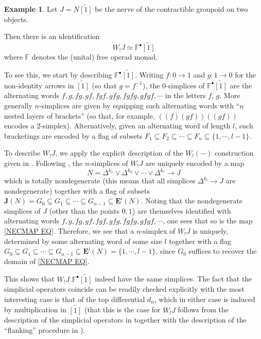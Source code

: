 \documentclass[a4paper,10pt
,draft
]{article}%
\numberwithin{equation}{section}
\numberwithin{figure}{section}
\theoremstyle{definition} %
\newtheorem{example}[equation]{Example}%
\newcommand{\1}{\ensuremath{\mathbbm 1}}%
\begin{document}
\begin{example}\label{WJ EX}
	Let $J = N \widetilde{[1]}$ be the nerve of the contractible groupoid on two objects.
	
	Then there is an identification
\[
	W_{!} J \simeq \mathbb{F}^{\bullet} \widetilde{[1]}
\]
	where $\mathbb{F}$ denotes the (unital) free operad monad.

	To see this, we start by describing
	$\mathbb{F}^{\bullet} \widetilde{[1]}$.
	Writing $f \colon 0 \to 1$ and 
	$g \colon  1\to 0$ for the non-identity arrows in 
	$\widetilde{[1]}$ (so that $g=f^{-1}$), the $0$-simplices of $\mathbb{F}^{\bullet} \widetilde{[1]}$
	are the alternating words
	$f,g,fg,gf,fgf,gfg,fgfg,gfgf,\cdots$
	in the letters $f$, $g$.
	More generally
	$n$-simplices are given by equipping such alternating words with ``$n$ nested layers of brackets''
	(so that, for example, 
	$\left((f)(gf)\right) 
	\left( (gf) \right)$
	encodes a $2$-simplex).
	Alternatively, given an alternating word of length $l$, such bracketings are encoded by a flag of subsets
	$F_1 \subseteq F_2 \subseteq \cdots 
	\subseteq F_n \subseteq \{1,\cdots,l-1\}$.
	
	To describe $W_{!} J$, we apply the explicit description of the $W_{!} (-)$ construction given in 
	\cite{DS11}.
	Following \cite[Cor. 4.8]{DS11}, the $n$-simplices of $W_{!} J$ are uniquely encoded by a map
\begin{equation}\label{NECMAP EQ}
	N = \Delta^{k_1} \vee \Delta^{k_2} 
	\vee \cdots \vee \Delta^{k_r} 
	\to J 
\end{equation}
which is totally nondegenerate (this means that all simplices $\Delta^{k_i} \to J$ are nondegenerate)
together with a flag of subsets
	$\boldsymbol{J}(N) = 
	G_0 \subseteq 
	G_1 \subseteq \cdots \subseteq
	G_{n-1} \subseteq \boldsymbol{E}^{\mathsf{i}}(N)$.
	Noting that the nondegenerate simplices of $J$ (other than the points $0,1$)
	are themselves identified with alternating words
	$f,g,fg,gf,fgf,gfg,fgfg,gfgf,\cdots$,
	one sees that so is the map \eqref{NECMAP EQ}.
	Therefore, we see that a $n$-simplex of 
	$W_{!} J$ is uniquely, determined by some alternating word of some size $l$ together with a flag  
	$G_0 \subseteq 
	G_1 \subseteq \cdots \subseteq
	G_{n-1} \subseteq \boldsymbol{E}^{\mathsf{i}}(N)
	=\{1,\cdots,l-1\}$, since 
	$G_0$ suffices to recover the domain of 
	\eqref{NECMAP EQ}.
	
	This shows that $W_{!} J$ $\mathbb{F}^{\bullet} \widetilde{[1]}$ indeed have the same simplices.
	The fact that the simplicial operators coincide can be readily checked explicitly with the most interesting case is that of the top differential $d_n$, which in either case is induced by multiplication in 
	$\widetilde{[1]}$ 
	(that this is the case for $W_{!} J$ follows from the description of the simplicial operators in 
	\cite[Cor. 4.4]{DS11} together with the description of the ``flanking'' procedure in \cite[Lemma 4.5]{DS11}).
\end{example}
\end{document}
